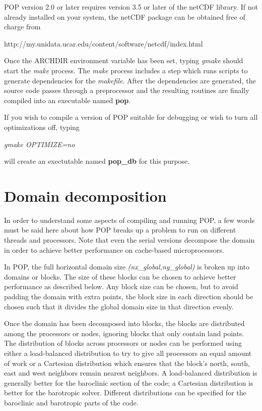 POP version 2.0 or later requires version 3.5 or later of the
netCDF library.  If not already installed on your system, the
netCDF package can be obtained free of charge from

\noindent
{}
{http://my.unidata.ucar.edu/content/software/netcdf/index.html}
\noindent

Once the ARCHDIR environment variable has been set, typing {\em gmake}
should start the {\em make} process. The {\em make} process includes a
step which runs scripts to generate dependencies for the {\em makefile}.
After the dependencies are generated, the source code passes through a
preprocessor and the resulting routines are finally compiled into an
executable named {\bf pop}.

If you wish to compile a version of POP suitable for
debugging or wish to turn all optimizations off, typing

{\em gmake OPTIMIZE=no}

\noindent
will create an exectutable named {\bf pop\_db} for this
purpose.

\section{Domain decomposition}\label{sec:domain-decomp}

In order to understand some aspects of compiling and running
POP, a few words must be said here about how POP breaks up
a problem to run on different threads and processors.  Note
that even the serial versions decompose the domain in order
to achieve better performance on cache-based microprocessors.

In POP, the full horizontal domain size
{\em (nx\_global,ny\_global)} is broken up into domains
or blocks. The size of these blocks can be chosen to
achieve better performance as described below.  Any block
size can be chosen, but to avoid padding the domain with
extra points, the block size in each direction should be
chosen such that it divides the global domain size in that
direction evenly.

Once the domain has been decomposed into blocks, the
blocks are distributed among the processors or nodes, ignoring
blocks that only contain land points.  The distribution
of blocks across processors or nodes can be performed using
either a load-balanced distribution to try to give all processors
an equal amount of work or a Cartesian distribution
which ensures that the block's north, south, east and
west neighbors remain nearest neighbors.  A
load-balanced distribution is generally better for
the baroclinic section of the code; a Cartesian
distribution is better for the barotropic solver.
Different distributions can be specified for the baroclinic
and barotropic parts of the code.

